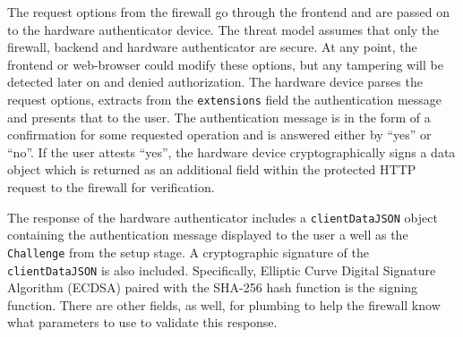 The request options from the firewall go through the frontend and are passed on to the hardware authenticator device. The threat model assumes that only the firewall, backend and hardware authenticator are secure. At any point, the frontend or web-browser could modify these options, but any tampering will be detected later on and denied authorization. The hardware device parses the request options, extracts from the \lstinline{extensions} field the authentication message and presents that to the user. The authentication message is in the form of a confirmation for some requested operation and is answered either by ``yes'' or ``no''. If the user attests ``yes'', the hardware device cryptographically signs a data object which is returned as an additional field within the protected HTTP request to the firewall for verification.

The response of the hardware authenticator includes a \lstinline{clientDataJSON} object containing the authentication message displayed to the user a well as the \lstinline{Challenge} from the setup stage. A cryptographic signature of the \lstinline{clientDataJSON} is also included. Specifically, Elliptic Curve Digital Signature Algorithm (ECDSA) paired with the SHA-256 hash function is the signing function. There are other fields, as well, for plumbing to help the firewall know what parameters to use to validate this response.



